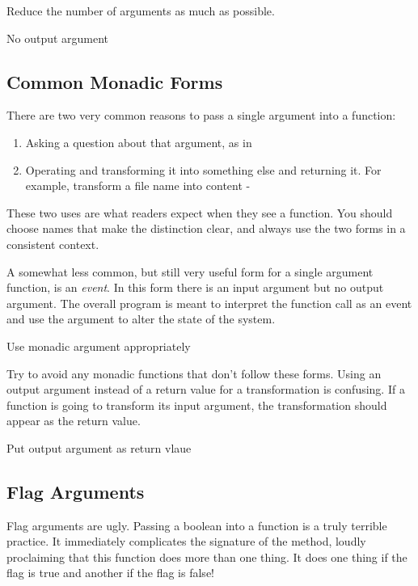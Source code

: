 \begin{marker}
Reduce the number of arguments as much as possible.

No output argument
\end{marker}

\subsection{Common Monadic Forms}

There are two very common reasons to pass a single argument into a function:

\begin{enumerate}
    \item Asking a question about that argument, as in 
    \item Operating and transforming it into something else and returning it. For example, transform a file name into content - 
\end{enumerate}

These two uses are what readers expect when they see a function. You should choose names that make the distinction clear, and always use the two forms in a consistent context.

A somewhat less common, but still very useful form for a single argument function, is an \textit{event}. In this form there is an input argument but no output argument. The overall program is meant to interpret the function call as an event and use the argument to alter the state of the system.

\begin{marker}
Use monadic argument appropriately
\end{marker}

Try to avoid any monadic functions that don't follow these forms. Using an output argument instead of a return value for a transformation is confusing. If a function is going to transform its input argument, the transformation should appear as the return value.

\begin{marker}
Put output argument as return vlaue
\end{marker}

\subsection{Flag Arguments}

Flag arguments are ugly. Passing a boolean into a function is a truly terrible practice. It immediately complicates the signature of the method, loudly proclaiming that this function does more than one thing. It does one thing if the flag is true and another if the flag is false!

